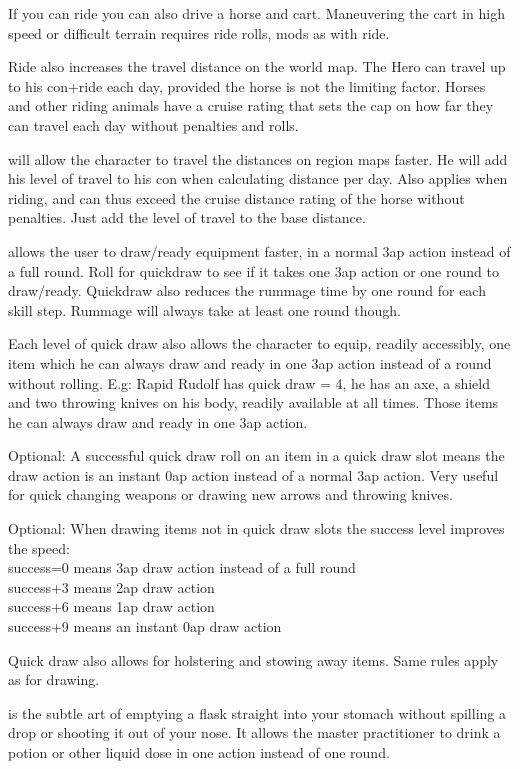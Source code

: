 If you can ride you can also drive a horse and cart. Maneuvering the cart in high speed or difficult terrain requires ride rolls, mods as with ride.

Ride also increases the travel distance on the world map. The Hero can travel up to his con+ride each day, provided the horse is not the limiting factor. Horses and other riding animals have a cruise rating that sets the cap on how far they can travel each day without penalties and rolls.


 will allow the character to travel the distances on region maps faster. He will add his level of travel to his con when calculating distance per day. Also applies when riding, and can thus exceed the cruise distance rating of the horse without penalties. Just add the level of travel to the base distance.


 allows the user to draw/ready equipment faster, in a normal 3ap action instead of a full round. Roll for quickdraw to see if it takes one 3ap action or one round to draw/ready. Quickdraw also reduces the rummage time by one round for each skill step. Rummage will always take at least one round though.

Each level of quick draw also allows the character to equip, readily accessibly, one item which he can always draw and ready in one 3ap action instead of a round without rolling.
E.g: Rapid Rudolf has quick draw = 4, he has an axe, a shield and two throwing knives on his body, readily available at all times. Those items he can always draw and ready in one 3ap action.

Optional: A successful quick draw roll on an item in a quick draw slot means the draw action is an instant 0ap action instead of a normal 3ap action. Very useful for quick changing weapons or drawing new arrows and throwing knives.

Optional: When drawing items not in quick draw slots the success level improves the speed:\\
success=0 means 3ap draw action instead of a full round\\
success+3 means 2ap draw action\\
success+6 means 1ap draw action\\
success+9 means an instant 0ap draw action

Quick draw also allows for holstering and stowing away items. Same rules apply as for drawing.


 is the subtle art of emptying a flask straight into your stomach without spilling a drop or shooting it out of your nose. It allows the master practitioner to drink a potion or other liquid dose in one action instead of one round.

